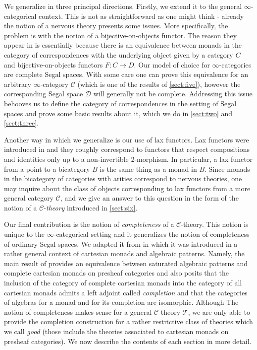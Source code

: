 \documentclass[a4paper, reqno]{amsart}
\theoremstyle{definition}
\newcommand\cC{\mathscr C}
\newcommand\cD{\mathscr D}
\newcommand\cT{\mathscr T}
\begin{document}
We generalize \cite{berger2012monads} in three principal directions. Firstly, we extend it to the general $\infty$-categorical context. This is not as straightforward as one might think - already the notion of a nervous theory presents some issues. More specifically, the problem is with the notion of a bijective-on-objects functor. The reason they appear in \cite{berger2012monads} is essentially because there is an equivalence between monads in the category of correspondences with the underlying object given by a category $C$ and bijective-on-objects functors $F:C\rightarrow D$. Our model of choice for $\infty$-categories are complete Segal spaces. With some care one can prove this equivalence for an arbitrary $\infty$-category $\cC$ (which is one of the results of \cref{sect:five}), however the corresponding Segal space $\cD$ will generally not be complete. Addressing this issue behooves us to define the category of correspondences in the setting of Segal spaces and prove some basic results about it, which we do in \cref{sect:two} and \cref{sect:three}.\par
Another way in which we generalize \cite{berger2012monads} is our use of lax functors. Lax functors were introduced in \cite{street1972two} and they roughly correspond to functors that respect compositions and identities only up to a non-invertible 2-morphism. In particular, a lax functor from a point to a bicategory $B$ is the same thing as a monad in $B$. Since monads in the bicategory of categories with arities correspond to nervous theories, one may inquire about the class of objects corresponding to lax functors from a more general category $\cC$, and we give an answer to this question in the form of the notion of a $\cC$-\textit{theory} introduced in \cref{sect:six}.\par
Our final contribution is the notion of \textit{completeness} of a $\cC$-theory. This notion is unique to the $\infty$-categorical setting and it generalizes the notion of completeness of ordinary Segal spaces. We adapted it from \cite{chu2019homotopy} in which it was introduced in a rather general context of cartesian monads and algebraic patterns. Namely, the main result of \cite{chu2019homotopy} provides an equivalence between saturated algebraic patterns and complete cartesian monads on presheaf categories and also posits that the inclusion of the category of complete cartesian monads into the category of all cartesian monads admits a left adjoint called \textit{completion} and that the categories of algebras for a monad and for its completion are isomorphic. Although The notion of completeness makes sense for a general $\cC$-theory $\cT$, we are only able to provide the completion construction for a rather restrictive class of theories which we call \textit{good} (those include the theories associated to cartesian monads on presheaf categories). We now describe the contents of each section in more detail.\par
\end{document}
